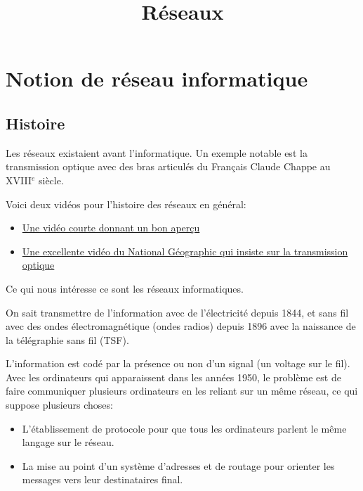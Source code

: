 \documentclass[a4paper,dvipsnames]{article}
\title{Réseaux}
\author{}
\date{}
\begin{document}
\renewcommand{\contentsname}{}

\pagestyle{fancy}

\begin{tcolorbox}[colframe=blue!75, colback=blue!45, valign=center, height=1.5cm, top=5mm]
  \maketitle
\end{tcolorbox}

\tableofcontents

\vspace{1cm}

\thispagestyle{fancy}

\section{Notion de réseau informatique}

\subsection{Histoire}

Les réseaux existaient avant l'informatique. Un exemple notable est la
transmission optique avec des bras articulés du Français Claude Chappe au
XVIII$^e$ siècle.

Voici deux vidéos pour l'histoire des réseaux en général:
\begin{itemize}
\item
\href{https://www.youtube.com/watch?v=LKGkmbz57ds}{Une vidéo courte donnant un bon aperçu}

\item \href{https://www.youtube.com/watch?v=0kjlITYI9Lk}{Une excellente vidéo du National Géographic qui insiste sur la
  transmission optique}

\end{itemize}

Ce qui nous intéresse ce sont les réseaux informatiques.

On sait transmettre de l'information avec de l'électricité depuis 1844, et sans
fil avec des ondes électromagnétique (ondes radios) depuis 1896 avec la
naissance de la télégraphie sans fil (TSF).

L'information est codé par la présence ou non d'un signal (un voltage sur le
fil). Avec les ordinateurs qui apparaissent dans les années 1950, le problème
est de faire communiquer plusieurs ordinateurs en les reliant sur un même
réseau, ce qui suppose plusieurs choses:
\begin{itemize}
  \item L'établissement de protocole pour que tous les ordinateurs parlent le
    même langage sur le réseau.
  \item La mise au point d'un système d'adresses et de routage pour orienter les
    messages vers leur destinataires final.
\end{itemize}
\end{document}

